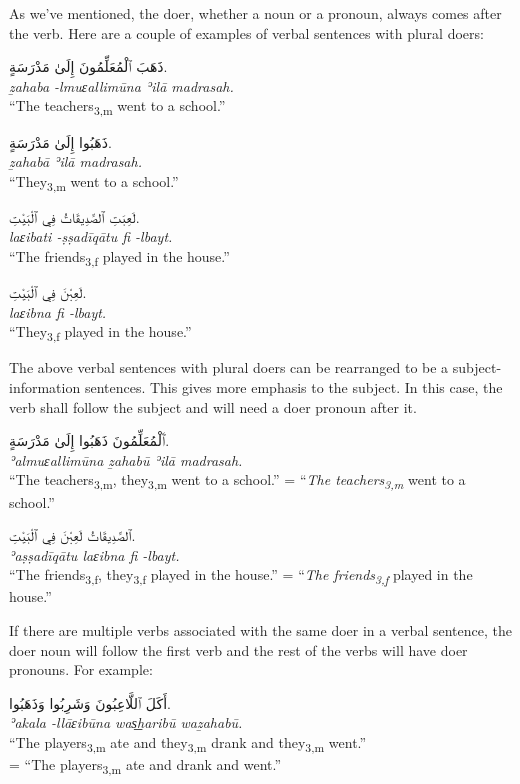 \documentclass[
  10pt,
]{book}
\begin{document}
As we've mentioned, the doer, whether a noun or a pronoun, always comes after the verb. Here are a couple of examples of verbal sentences with plural doers:

\foreignlanguage{arabic}{ذَهَبَ ٱلْمُعَلِّمُونَ إِلَىٰ مَدْرَسَةٍ.}\\
\emph{ẕahaba -lmuɛallimūna ʾilā madrasah.}\\
\enquote{The teachers\textsubscript{3,m} went to a school.}

\foreignlanguage{arabic}{ذَهَبُوا إِلَىٰ مَدْرَسَةٍ.}\\
\emph{ẕahabā ʾilā madrasah.}\\
\enquote{They\textsubscript{3,m} went to a school.}

\foreignlanguage{arabic}{لَعِبَتِ ٱلصَّدِيقَاتُ فِي ٱلْبَيْتِ.}\\
\emph{laɛibati -ṣṣadīqātu fi -lbayt.}\\
\enquote{The friends\textsubscript{3,f} played in the house.}

\foreignlanguage{arabic}{لَعِبْنَ فِي ٱلْبَيْتِ.}\\
\emph{laɛibna fi -lbayt.}\\
\enquote{They\textsubscript{3,f} played in the house.}

The above verbal sentences with plural doers can be rearranged to be a subject-information sentences. This gives more emphasis to the subject. In this case, the verb shall follow the subject and will need a doer pronoun after it.

\foreignlanguage{arabic}{ٱَلْمُعَلِّمُونَ ذَهَبُوا إِلَىٰ مَدْرَسَةٍ.}\\
\emph{ʾalmuɛallimūna ẕahabū ʾilā madrasah.}\\
\enquote{The teachers\textsubscript{3,m}, they\textsubscript{3,m} went to a school.}
= \enquote{\emph{The teachers\textsubscript{3,m}} went to a school.}

\foreignlanguage{arabic}{ٱلصَّدِيقَاتُ لَعِبْنَ فِي ٱلْبَيْتِ.}\\
\emph{ʾaṣṣadīqātu laɛibna fi -lbayt.}\\
\enquote{The friends\textsubscript{3,f}, they\textsubscript{3,f} played in the house.}
= \enquote{\emph{The friends\textsubscript{3,f}} played in the house.}

If there are multiple verbs associated with the same doer in a verbal sentence, the doer noun will follow the first verb and the rest of the verbs will have doer pronouns. For example:

\foreignlanguage{arabic}{أَکَلَ ٱللَّاعِبُونَ وَشَرِبُوا وَذَهَبُوا.}\\
\emph{ʾakala -llāɛibūna was͟haribū waẕahabū.}\\
\enquote{The players\textsubscript{3,m} ate and they\textsubscript{3,m} drank and they\textsubscript{3,m} went.}\\
= \enquote{The players\textsubscript{3,m} ate and drank and went.}
\end{document}
